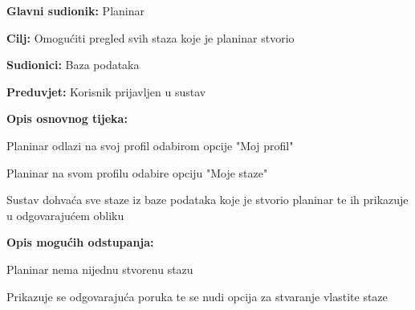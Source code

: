 			\noindent {}
		\begin{packed_item}
			
			\item \textbf{Glavni sudionik: }$ $Planinar$ $
			\item  \textbf{Cilj:} $ $Omogućiti pregled svih staza koje je planinar stvorio$ $
			\item  \textbf{Sudionici:} $ $Baza podataka$ $
			\item  \textbf{Preduvjet:} $ $Korisnik prijavljen u sustav$ $
			\item  \textbf{Opis osnovnog tijeka:}
			
			\item[] \begin{packed_enum}
				\item $ $Planinar odlazi na svoj profil odabirom opcije "Moj profil"$ $
				\item $ $Planinar na svom profilu odabire opciju "Moje staze"$ $
				\item $ $Sustav dohvaća sve staze iz baze podataka koje je stvorio planinar te ih prikazuje u odgovarajućem obliku$ $
			\end{packed_enum}
		\item  \textbf{Opis mogućih odstupanja:}
			\item[] \begin{packed_item}
				
				\item[3.a] $ $Planinar nema nijednu stvorenu stazu$ $
				\item[] \begin{packed_enum}
					\item $ $Prikazuje se odgovarajuća poruka te se nudi opcija za stvaranje vlastite staze$ $
				\end{packed_enum}
			\end{packed_item}
		\end{packed_item}
	
